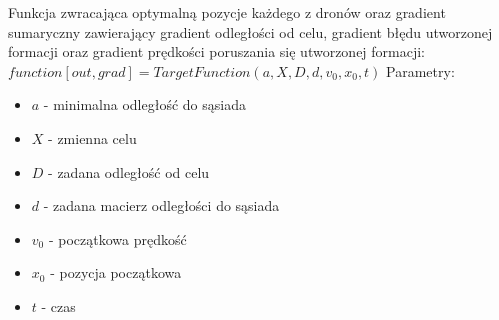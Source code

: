 \documentclass[a4paper, 11pt, oneside]{article}
\begin{document}
Funkcja zwracająca optymalną pozycje każdego z dronów oraz gradient sumaryczny zawierający gradient odległości od celu, gradient błędu utworzonej formacji oraz gradient prędkości poruszania się utworzonej formacji:
\newline 
$function [out,grad]=TargetFunction(a,X,D,d,v_{0},x_{0},t)$
\newline
Parametry:
\begin{itemize}
\item $a$ - minimalna odległość do sąsiada
\item $X$ - zmienna celu
\item $D$ - zadana odległość od celu 
\item $d$ - zadana macierz odległości do sąsiada
\item $v_{0}$ - początkowa prędkość
\item $x_{0}$ - pozycja początkowa
\item $t$ -  czas
\end{itemize}
\end{document}
